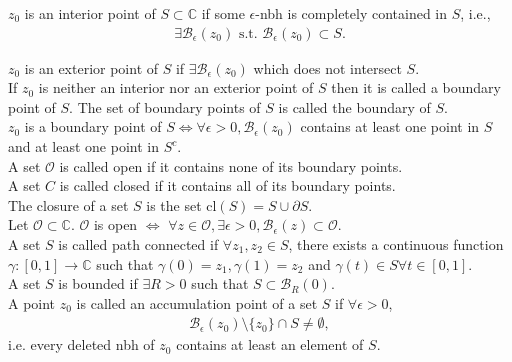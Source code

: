 \documentclass{article}
\theoremstyle{definition}
\newcommand{\p}{\partial}
\newcommand{\C}{\mathbb{C}}
\newcommand{\B}{\mathcal{B}}
\begin{document}
\noindent $z_0$ is an interior point of $S \subset \C$ if some $\epsilon$-nbh is completely contained in $S$, i.e.,
\begin{align}
\exists \B_\epsilon(z_0) \text{ s.t. } \B_\epsilon(z_0) \subset S.
\end{align}


\noindent $z_0$ is an exterior point of $S$ if $\exists \B_\epsilon(z_0)$ which does not intersect $S$.\\

\noindent If $z_0$ is neither an interior nor an exterior point of $S$ then it is called a boundary point of $S$. The set of boundary points of $S$ is called the boundary of $S$.\\

\noindent $z_0$ is a boundary point of $S \iff \forall \epsilon> 0, \B_\epsilon(z_0)$ contains at least one point in $S$ and at least one point in $S^c$.\\

\noindent A set $\mathcal{O}$ is called open if it contains none of its boundary points. \\

\noindent A set $C$ is called closed if it contains all of its boundary points. \\

\noindent The closure of a set $S$ is the set $\text{cl}(S) = S \cup \p S$.\\

\noindent Let $\mathcal{O} \subset \C$. $\mathcal{O}$ is open $\iff$ $\forall z \in \mathcal{O}, \exists \epsilon > 0, \B_\epsilon(z) \subset \mathcal{O}$.  \\

\noindent A set $S$ is called path connected if $\forall z_1,z_2 \in S$, there exists a continuous function $\gamma: [0,1] \to \C$ such that $\gamma(0) = z_1, \gamma(1) = z_2$ and $\gamma(t) \in S \forall t \in [0,1]$.\\

\noindent A set $S$ is bounded if $\exists R > 0$ such that $S \subset \B_R(0)$.\\

\noindent A point $z_0$ is called an accumulation point of a set $S$ if $\forall \epsilon > 0$,
\begin{align}
\B_\epsilon(z_0)\setminus\{z_0\} \cap S \neq \emptyset,
\end{align} 
i.e. every deleted nbh of $z_0$ contains at least an element of $S$. \\
\end{document}
